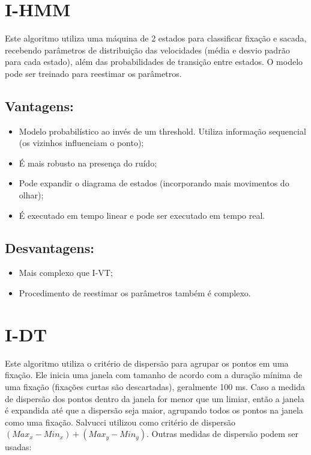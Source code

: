 \documentclass[brazil,]{report}
\begin{document}
\section{I-HMM}\label{i-hmm}

Este algoritmo utiliza uma máquina de 2 estados para classificar fixação
e sacada, recebendo parâmetros de distribuição das velocidades (média e
desvio padrão para cada estado), além das probabilidades de transição
entre estados. O modelo pode ser treinado para reestimar os parâmetros.

\subsection{Vantagens:}\label{vantagens-1}

\begin{itemize}
\itemsep1pt\parskip0pt
\item
  Modelo probabilístico ao invés de um threshold. Utiliza informação
  sequencial (os vizinhos influenciam o ponto);
\item
  É mais robusto na presença do ruído;
\item
  Pode expandir o diagrama de estados (incorporando mais movimentos do
  olhar);
\item
  É executado em tempo linear e pode ser executado em tempo real.
\end{itemize}

\subsection{Desvantagens:}\label{desvantagens-1}

\begin{itemize}
\itemsep1pt\parskip0pt
\item
  Mais complexo que I-VT;
\item
  Procedimento de reestimar os parâmetros também é complexo.
\end{itemize}

\section{I-DT}\label{i-dt}

Este algoritmo utiliza o critério de dispersão para agrupar os pontos em
uma fixação. Ele inicia uma janela com tamanho de acordo com a duração
mínima de uma fixação (fixações curtas são descartadas), geralmente 100
ms. Caso a medida de dispersão dos pontos dentro da janela for menor que
um limiar, então a janela é expandida até que a dispersão seja maior,
agrupando todos os pontos na janela como uma fixação. Salvucci utilizou
como critério de dispersão $(Max_x - Min_x) + (Max_y - Min_y)$. Outras
medidas de dispersão podem ser usadas:
\end{document}
